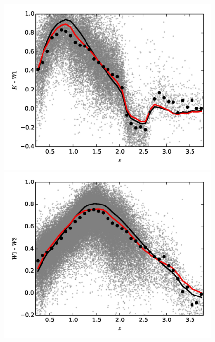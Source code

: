 \begin{figure}
\begin{minipage}[b]{0.49\textwidth}
    \includegraphics[width=\textwidth]{figures/chapter06/kw1.jpg}
  \end{minipage}
  \begin{minipage}[b]{0.49\textwidth}
    \includegraphics[width=\textwidth]{figures/chapter06/w1w2.jpg}
  \end{minipage} \\
\begin{minipage}[b]{0.49\textwidth}

\end{minipage}
\end{figure}
